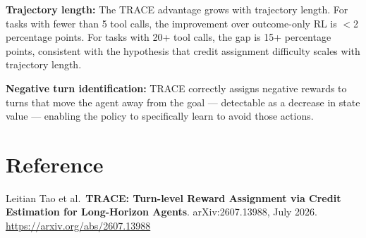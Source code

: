 \documentclass[10pt,twocolumn]{article}
\begin{document}
\textbf{Trajectory length:} The TRACE advantage grows with
trajectory length. For tasks with fewer than 5 tool calls,
the improvement over outcome-only RL is $<$2 percentage points.
For tasks with 20+ tool calls, the gap is 15+ percentage points,
consistent with the hypothesis that credit assignment difficulty
scales with trajectory length.

\textbf{Negative turn identification:} TRACE correctly assigns
negative rewards to turns that move the agent away from the goal
--- detectable as a decrease in state value --- enabling the
policy to specifically learn to avoid those actions.

\section*{Reference}

Leitian Tao et al.\
\textbf{TRACE: Turn-level Reward Assignment via Credit Estimation
for Long-Horizon Agents}.
arXiv:2607.13988, July 2026.
\url{https://arxiv.org/abs/2607.13988}
\end{document}
